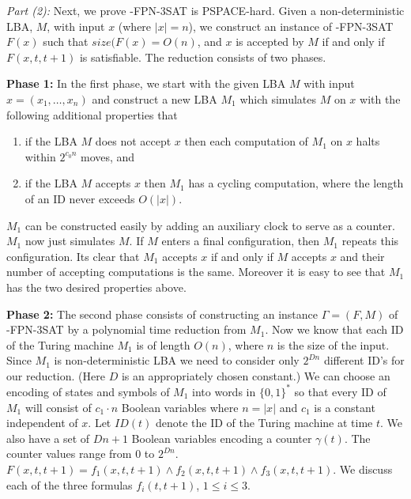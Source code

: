 \smallskip

\noindent
{\em Part (2):}
Next, we prove {-FPN-3SAT} is {\sf PSPACE}-hard. 
Given a non-deterministic {\sf LBA},
$M$, with input $x$ (where $|x| = n$), 
we construct an instance of {-FPN-3SAT} $F(x)$ such that
$size(F(x)=  O(n)$,
and $x$ is accepted by $M$ if and only if $F(x,t,t+1)$ is satisfiable.
The reduction consists of two phases. 

\noindent
{\bf Phase 1:}
In the first phase, we
start with the given {\sf LBA} $M$ with input 
$x = (x_1, \ldots, x_n)$ and construct
a new {\sf LBA} $M_1$ which simulates $M$ on $x$ with the
following additional properties that
\begin{enumerate}
\item
if the {\sf LBA} $M$ does not accept $x$ then
each computation of $M_1$ on $x$ halts within $2^{c_0n}$ moves, and 
\item
if the {\sf LBA} $M$ accepts $x$ then $M_1$ has a cycling computation,
where the length of an ID never exceeds $O(|x|)$.

\end{enumerate}



$M_1$ can be constructed easily by adding an auxiliary  clock to serve 
as a counter. $M_1$ now just simulates $M$.  
If $M$ enters a final configuration, then $M_1$ repeats this
configuration. Its clear that 
$M_1$ accepts $x$
if and only if $M$ accepts $x$ and their number of
accepting computations is the same. Moreover it is easy to see that
$M_1$ has the two desired properties above.



\noindent
{\bf Phase 2:}
The second phase consists of constructing an instance 
$\Gamma = (F, M)$ of 
{-FPN-3SAT} by a polynomial time reduction from $M_1$. 
Now we know that each ID of the Turing machine $M_1$ is 
of length $O(n)$, where $n$ is the size of the input.
Since $M_1$ is non-deterministic {\sf LBA}
we need to consider only $2^{Dn}$ different ID's for
our reduction. (Here $D$ is an appropriately chosen constant.)  
We can choose
an encoding of states and symbols of $M_1$ into words in $\{0,1\}^*$ so
that every ID of $M_1$ will consist of $c_1 \cdot n$ Boolean variables where
$n=|x|$ and $c_1$ is a constant independent of $x$. Let $ID(t)$ denote
the {\sf ID} of the Turing machine at time $t$. We also have 
a set of $Dn+1$ Boolean variables encoding a counter $\gamma(t)$. The counter
values range from $0$ to $2^{Dn}$. 
$F(x, t,t+1) = f_1(x,t,t+1) \wedge f_2(x,t,t+1) \wedge f_3(x, t, t+1)$. 
We discuss each of the three formulas $f_i(t,t+1)$, $1 \leq i \leq 3$.

